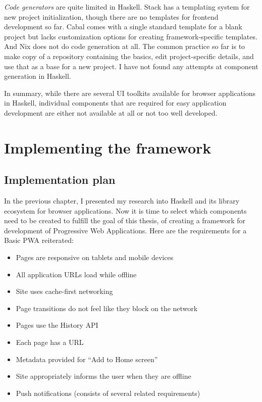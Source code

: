 \documentclass[english,odsaz]{fitthesis}
\begin{document}
\emph{Code generators} are quite limited in Haskell. Stack has a templating system for
new project initialization, though there are no templates for frontend
development so far. Cabal comes with a single standard template for a blank
project but lacks customization options for creating framework-specific
templates. And Nix does not do code generation at all. The common practice so
far is to make copy of a repository containing the basics, edit project-specific
details, and use that as a base for a new project. I have not found any attempts
at component generation in Haskell.

In summary, while there are several UI toolkits available for browser
applications in Haskell, individual components that are required for easy
application development are either not available at all or not too well
developed.

\chapter{Implementing the framework}
\label{sec:org12559f8}
\section{Implementation plan}
\label{sec:org2a8aea5}
In the previous chapter, I presented my research into Haskell and its library
ecosystem for browser applications. Now it is time to select which components
need to be created to fulfill the goal of this thesis, of creating a framework
for development of Progressive Web Applications. Here are the requirements for a
Basic PWA reiterated:

\begin{itemize}
\item Pages are responsive on tablets and mobile devices
\item All application URLs load while offline
\item Site uses cache-first networking
\item Page transitions do not feel like they block on the network
\item Pages use the History API
\item Each page has a URL
\item Metadata provided for ``Add to Home screen''
\item Site appropriately informs the user when they are offline
\item Push notifications (consists of several related requirements)
\end{itemize}
\end{document}

